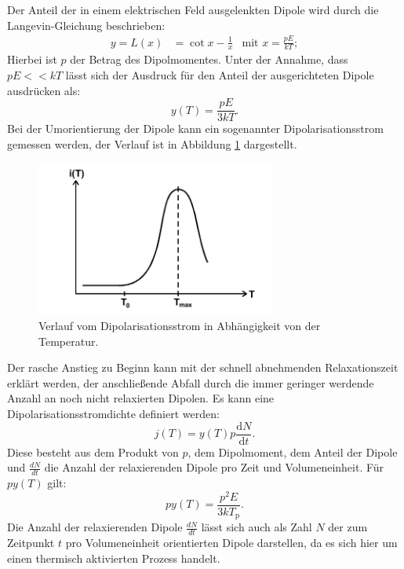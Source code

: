 Der Anteil der in einem elektrischen Feld ausgelenkten Dipole wird durch die Langevin-Gleichung beschrieben:
\begin{align}
  y=L(x)&=\cot{x}-\frac{1}{x}   &\text{mit}\,\, x=\frac{pE}{kT};
\end{align}
Hierbei ist $p$ der Betrag des Dipolmomentes. Unter der Annahme, dass $pE<<kT$ lässt sich der Ausdruck
für den Anteil der ausgerichteten Dipole ausdrücken als:
\begin{equation}
  y(T)=\frac{pE}{3kT}.
\end{equation}
Bei der Umorientierung der Dipole kann ein sogenannter Dipolarisationsstrom gemessen werden, der Verlauf
ist in Abbildung \ref{fig:strom} dargestellt.
\begin{figure}
    \centering
    \includegraphics[width=0.7\textwidth]{strom.PNG}
    \caption{Verlauf vom Dipolarisationsstrom in Abhängigkeit von der Temperatur.\cite{skript}}
    \label{fig:strom}
\end{figure}
Der rasche Anstieg zu Beginn kann mit der schnell abnehmenden Relaxationszeit erklärt werden,
der anschließende Abfall durch die immer geringer werdende Anzahl an noch nicht relaxierten Dipolen.
Es kann eine Dipolarisationsstromdichte definiert werden:
\begin{equation}
  j(T)=y(T)p\frac{\mathrm{d}N}{\mathrm{d}t}\label{eqn:stromdichte}.
\end{equation}
Diese besteht aus dem Produkt von $p$, dem Dipolmoment, dem
Anteil der Dipole und $\frac{dN}{dt}$
die Anzahl der relaxierenden Dipole pro Zeit und Volumeneinheit.
Für $py(T)$ gilt:
\begin{equation}
py(T)=\frac{p^2E}{3kT_\mathrm{p}}.\label{eqn:prod}
\end{equation}
Die Anzahl der relaxierenden Dipole $\frac{dN}{dt}$ lässt sich auch als Zahl $N$ der zum Zeitpunkt $t$ pro Volumeneinheit orientierten Dipole
darstellen, da es sich hier um einen thermisch aktivierten Prozess handelt.
